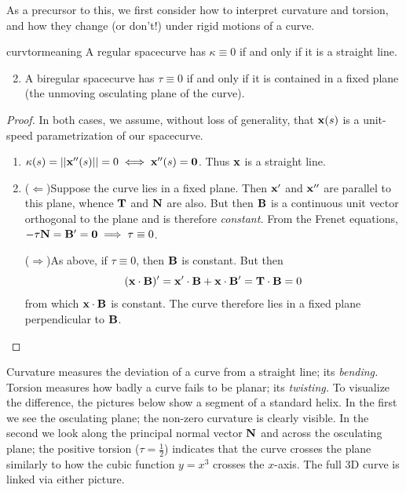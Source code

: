 As a precursor to this, we first consider how to interpret curvature and torsion, and how they change (or don't!) under rigid motions of a curve.

\begin{thm}{}{curvtormeaning}
\exstart A regular spacecurve has $\kappa\equiv 0$ if and only if it is a straight line.
\begin{enumerate}\setcounter{enumi}{1}
  \item A biregular spacecurve has $\tau\equiv 0$ if and only if it is contained in a fixed plane (the unmoving osculating plane of the curve).
\end{enumerate}
\end{thm}

\begin{proof}
In both cases, we assume, without loss of generality, that ${\mathbf{x}}(s)$ is a unit-speed parametrization of our spacecurve.
\begin{enumerate}
  \item $\kappa(s)=\left| \left| {\mathbf{x}}''(s)\right|\right|=0\iff{\mathbf{x}}''(s)=\mathbf{0}$. Thus ${\mathbf{x}}$ is a straight line.
  \item ($\Leftarrow$)\quad Suppose the curve lies in a fixed plane. Then ${\mathbf{x}}'$ and ${\mathbf{x}}''$ are parallel to this plane, whence ${\mathbf{T}}$ and ${\mathbf{N}}$ are also. But then ${\mathbf{B}}$ is a continuous unit vector orthogonal to the plane and is therefore \emph{constant.} From the Frenet equations, $-\tau{\mathbf{N}}={\mathbf{B}}'=\mathbf{0}\implies \tau\equiv 0$.\par
  ($\Rightarrow$)\quad As above, if $\tau\equiv 0$, then ${\mathbf{B}}$ is constant. But then
  \[({\mathbf{x}}\cdot{\mathbf{B}})'={\mathbf{x}}'\cdot{\mathbf{B}}+{\mathbf{x}}\cdot{\mathbf{B}}'={\mathbf{T}}\cdot{\mathbf{B}}=0\]
  from which ${\mathbf{x}}\cdot{\mathbf{B}}$ is constant. The curve therefore lies in a fixed plane perpendicular to ${\mathbf{B}}$.\qedhere
\end{enumerate}
\end{proof}


Curvature measures the deviation of a curve from a straight line; its \emph{bending.} Torsion measures how badly a curve fails to be planar; its \emph{twisting.}\smallbreak
To visualize the difference, the pictures below show a segment of a standard helix. In the first we see the osculating plane; the non-zero curvature is clearly visible. In the second we look along the principal normal vector ${\mathbf{N}}$ and across the osculating plane; the positive torsion ($\tau=\frac 12$) indicates that the curve crosses the plane similarly to how the cubic function $y=x^3$ crosses the $x$-axis. The full 3D curve is linked via either picture.


